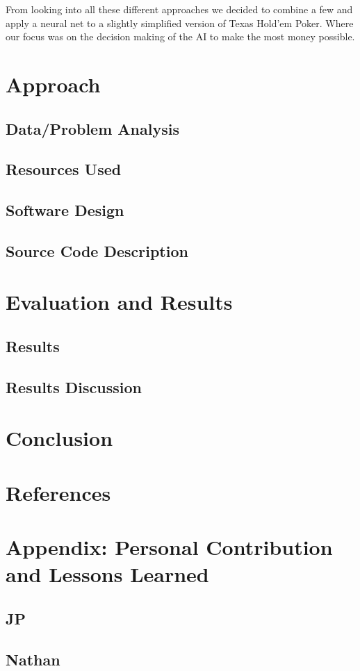 From looking into all these different approaches we decided to combine a few and apply a neural net to a slightly simplified version of Texas Hold'em Poker. Where our focus was on the decision making of the AI to make the most money possible.

\section{Approach}
\subsection{Data/Problem Analysis}

\subsection{Resources Used}

\subsection{Software Design}

\subsection{Source Code Description}

\section{Evaluation and Results}

\subsection{Results}

\subsection{Results Discussion}

\section{Conclusion}

\section{References}
\printbibliography

\section{Appendix: Personal Contribution and Lessons Learned}
\subsection{JP}

\subsection{Nathan}


